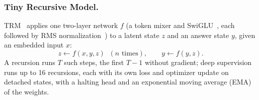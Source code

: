 \documentclass{svproc}
\begin{document}
\subsubsection{Tiny Recursive Model.}
TRM~\cite{trm} applies one two-layer network $f$ (a token mixer and SwiGLU~\cite{glu}, each followed by RMS normalization~\cite{rmsnorm}) to a latent state $z$ and an answer state $y$, given an embedded input $x$:
\begin{equation}
z \leftarrow f(x, y, z) \;\; (n \text{ times}), \qquad y \leftarrow f(y, z).
\label{eq:trm}
\end{equation}
A recursion runs $T$ such steps, the first $T{-}1$ without gradient; deep supervision runs up to 16 recursions, each with its own loss and optimizer update on detached states, with a halting head and an exponential moving average (EMA) of the weights.
\end{document}
